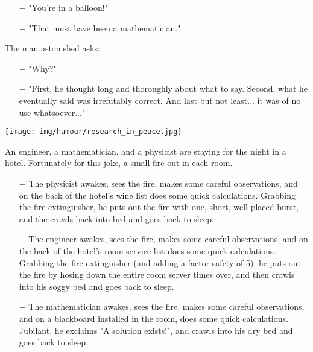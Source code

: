 	\begin{itemize}	 
		\item[$-$]  "You're in a balloon!"
	
		\item[$-$] "That must have been a mathematician."
	\end{itemize}
	
	The man astonished asks:
	
	\begin{itemize}	 
		\item[$-$] "Why?"
	
		\item[$-$]  "First, he thought long and thoroughly about what to say. Second, what he eventually said was irrefutably correct. And last but not least... it was of no use whatsoever..."
	\end{itemize}
		
	\begin{center}\underline{\hspace{5 cm}}\end{center}
	
	\begin{center}
		\texttt{[image: img/humour/research\_in\_peace.jpg]}	
	\end{center}
	
	\begin{center}\underline{\hspace{5 cm}}\end{center}

An engineer, a mathematician, and a physicist are staying for the night in a hotel. Fortunately for this joke, a small fire out in each room.

\begin{itemize}	 
	\item[$-$] The physicist awakes, sees the fire, makes some careful observations, and on the back of the hotel's wine list does some quick calculations. Grabbing the fire extinguisher, he puts out the fire with one, short, well placed burst, and the crawls back into bed and goes back to sleep.

	\item[$-$] The engineer awakes, sees the fire, makes some careful observations, and on the back of the hotel's room service list does some quick calculations. Grabbing the fire extinguisher (and adding a factor safety of 5), he puts out the fire by hosing down the entire room server times over, and then crawls into his soggy bed and goes back to sleep.

	\item[$-$] The mathematician awakes, sees the fire, makes some careful observations, and on a blackboard installed in the room, does some quick calculations. Jubilant, he exclaims "A solution exists!", and crawls into his dry bed and goes back to sleep.
\end{itemize}
	
